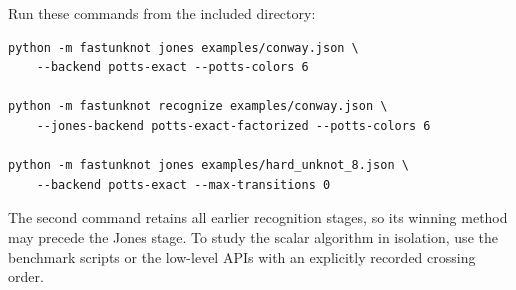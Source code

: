 Run these commands from the included  directory:
\begin{lstlisting}
python -m fastunknot jones examples/conway.json \
    --backend potts-exact --potts-colors 6

python -m fastunknot recognize examples/conway.json \
    --jones-backend potts-exact-factorized --potts-colors 6

python -m fastunknot jones examples/hard_unknot_8.json \
    --backend potts-exact --max-transitions 0
\end{lstlisting}
The second command retains all earlier recognition stages, so its winning
method may precede the Jones stage. To study the scalar algorithm in
isolation, use the benchmark scripts or the low-level APIs with an explicitly
recorded crossing order.
